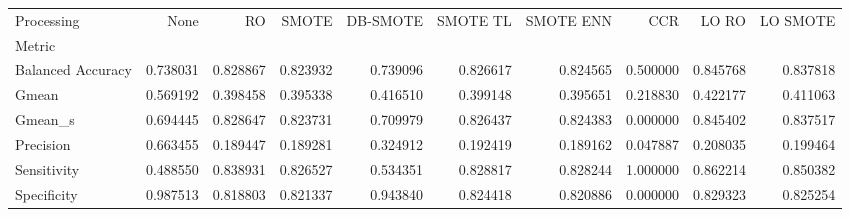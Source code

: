 \begin{tabular}{lrrrrrrrrr}
\toprule
Processing &      None &        RO &     SMOTE &  DB-SMOTE &  SMOTE TL &  SMOTE ENN &       CCR &     LO RO &  LO SMOTE \\
Metric            &           &           &           &           &           &            &           &           &           \\
\midrule
Balanced Accuracy &  0.738031 &  0.828867 &  0.823932 &  0.739096 &  0.826617 &   0.824565 &  0.500000 &  0.845768 &  0.837818 \\
Gmean             &  0.569192 &  0.398458 &  0.395338 &  0.416510 &  0.399148 &   0.395651 &  0.218830 &  0.422177 &  0.411063 \\
Gmean_s           &  0.694445 &  0.828647 &  0.823731 &  0.709979 &  0.826437 &   0.824383 &  0.000000 &  0.845402 &  0.837517 \\
Precision         &  0.663455 &  0.189447 &  0.189281 &  0.324912 &  0.192419 &   0.189162 &  0.047887 &  0.208035 &  0.199464 \\
Sensitivity       &  0.488550 &  0.838931 &  0.826527 &  0.534351 &  0.828817 &   0.828244 &  1.000000 &  0.862214 &  0.850382 \\
Specificity       &  0.987513 &  0.818803 &  0.821337 &  0.943840 &  0.824418 &   0.820886 &  0.000000 &  0.829323 &  0.825254 \\
\bottomrule
\end{tabular}
